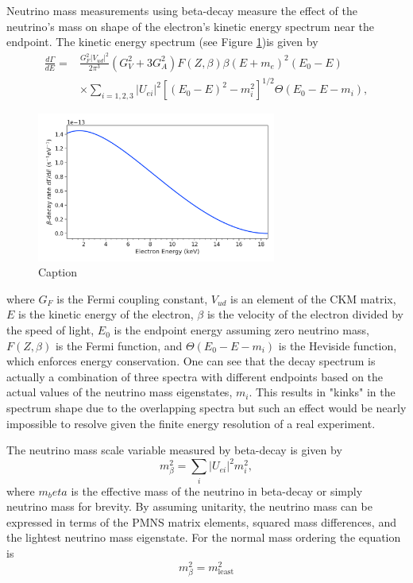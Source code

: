 Neutrino mass measurements using beta-decay measure the effect of the neutrino's mass on shape of the electron's kinetic energy spectrum near the endpoint. The kinetic energy spectrum (see Figure \ref{fig:chap2-tritium-spectrum})is given by 
\begin{equation}
\begin{split}
    \frac{d\Gamma}{dE}=&\frac{G_F^2|V_{ud}|^2}{2\pi^3}(G_V^2+3G_A^2)F(Z,\beta)\beta(E+m_e)^2(E_0-E)\\
    &\times \sum_{i=1,2,3}{|U_{ei}|^2[(E_0-E)^2-m_i^2]^{1/2}\Theta(E_0-E-m_i)},
\end{split}
\end{equation}
\begin{figure}[htbp]
    \centering
    \includegraphics[width=0.7\textwidth]{figs/Chapter-2/230302_atomic_tritium_spectrum.png}
    \caption{Caption}
    \label{fig:chap2-tritium-spectrum}
\end{figure}
where $G_F$ is the Fermi coupling constant, $V_{ud}$ is an element of the CKM matrix, $E$ is the kinetic energy of the electron, $\beta$ is the velocity of the electron divided by the speed of light, $E_0$ is the endpoint energy assuming zero neutrino mass, $F(Z,\beta)$ is the Fermi function, and $\Theta(E_0-E-m_i)$ is the Heviside function, which enforces energy conservation. One can see that the decay spectrum is actually a combination of three spectra with different endpoints based on the actual values of the neutrino mass eigenstates, $m_i$. This results in "kinks" in the spectrum shape due to the overlapping spectra but such an effect would be nearly impossible to resolve given the finite energy resolution of a real experiment. 

The neutrino mass scale variable measured by beta-decay is given by 
\begin{equation}
    m_\beta^2=\sum_i{|U_{ei}|^2}m_i^2,
\end{equation}
where $m_beta$ is the effective mass of the neutrino in beta-decay or simply neutrino mass for brevity. By assuming unitarity, the neutrino mass can be expressed in terms of the PMNS matrix elements, squared mass differences, and the lightest neutrino mass eigenstate. For the normal mass ordering the equation is
\begin{equation}
    m_\beta^2=m^2_\textrm{least} 
\end{equation} 


